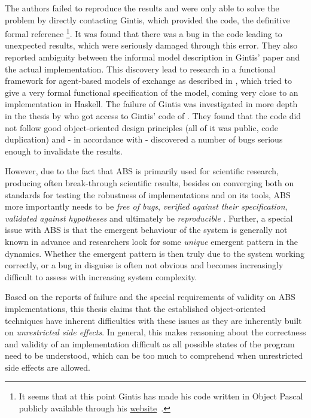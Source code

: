 The authors \cite{botta2013mathematical} failed to reproduce the results and were only able to solve the problem by directly contacting Gintis, which provided the code, the definitive formal reference \footnote{It seems that at this point Gintis has made his code written in Object Pascal publicly available through his \href{https://people.umass.edu/gintis/}{website}~\cite{gintis_herbert_website}.}. It was found that there was a bug in the code leading to unexpected results, which were seriously damaged through this error. They also reported ambiguity between the informal model description in Gintis' paper and the actual implementation.
This discovery lead to research in a functional framework for agent-based models of exchange as described in \cite{botta_functional_2011}, which tried to give a very formal functional specification of the model, coming very close to an implementation in Haskell. The failure of Gintis was investigated in more depth in the thesis by \cite{evensen_extensible_2010} who got access to Gintis' code of \cite{gintis_emergence_2006}. They found that the code did not follow good object-oriented design principles (all of it was public, code duplication) and - in accordance with \cite{botta2013mathematical} - discovered a number of bugs serious enough to invalidate the results.

\medskip

However, due to the fact that ABS is primarily used for scientific research, producing often break-through scientific results, besides on converging both on standards for testing the robustness of implementations and on its tools, ABS more importantly needs to be \textit{free of bugs}, \textit{verified against their specification}, \textit{validated against hypotheses} and ultimately be \textit{reproducible} \cite{axelrod_chapter_2006}. Further, a special issue with ABS is that the emergent behaviour of the system is generally not known in advance and researchers look for some \textit{unique} emergent pattern in the dynamics. Whether the emergent pattern is then truly due to the system working correctly, or a bug in disguise is often not obvious and becomes increasingly difficult to assess with increasing system complexity. 

Based on the reports of failure and the special requirements of validity on ABS implementations, this thesis claims that the established object-oriented techniques have inherent difficulties with these issues as they are inherently built on \textit{unrestricted side effects}. In general, this makes reasoning about the correctness and validity of an implementation difficult as all possible states of the program need to be understood, which can be too much to comprehend when unrestricted side effects are allowed.

